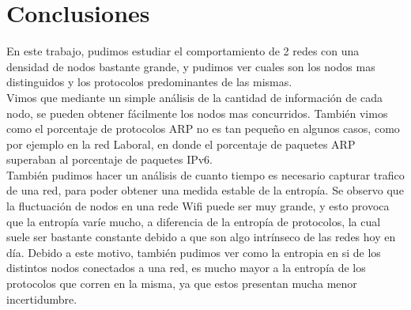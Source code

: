 \section{Conclusiones}

En este trabajo, pudimos estudiar el comportamiento de 2 redes con una densidad de nodos bastante grande, y pudimos ver cuales son los nodos mas distinguidos y los protocolos predominantes de las mismas.\\

Vimos que mediante un simple análisis de la cantidad de información de cada nodo, se pueden obtener fácilmente los nodos mas concurridos. También vimos como el porcentaje de protocolos ARP no es tan pequeño en algunos casos, como por ejemplo en la red Laboral, en donde el porcentaje de paquetes ARP superaban al porcentaje de paquetes IPv6.\\

También pudimos hacer un análisis de cuanto tiempo es necesario capturar trafico de una red, para poder obtener una medida estable de la entropía. Se observo que la fluctuación de nodos en una rede Wifi puede ser muy grande, y esto provoca que la entropía varíe mucho, a diferencia de la entropía de protocolos, la cual suele ser bastante constante debido a que son algo intrínseco de las redes hoy en día. Debido a este motivo, también pudimos ver como la entropia en si de los distintos nodos conectados a una red, es mucho mayor a la entropía de los protocolos que corren en la misma, ya que estos presentan mucha menor incertidumbre.
